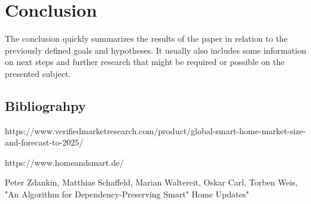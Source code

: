 \chapter{Conclusion}

The conclusion quickly summarizes the results of the paper
in relation to the previously defined goals and hypotheses.
It usually also includes some information on next steps and further research
that might be required or possible on the presented subject.



\section{Bibliograhpy}

\begin{thebibliography}{9}

https://www.verifiedmarketresearch.com/product/global-smart-home-market-size-and-forecast-to-2025/

https://www.homeandsmart.de/

Peter Zdankin, Matthias Schaffeld, Marian Waltereit, Oskar Carl, Torben Weis, "An Algorithm for Dependency-Preserving Smart"
Home Updates"

\end{thebibliography}